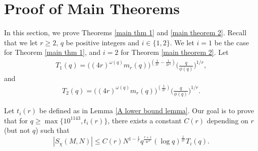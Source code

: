 \documentclass[12pt]{amsart}
\theoremstyle{plain}
\theoremstyle{definition}
\begin{document}
\section{Proof of Main Theorems}\label{sec: main theorems}
In this section, we prove Theorems \ref{main thm 1} and \ref{main theorem 2}. Recall that we let $r\ge 2$, $q$ be positive integers and $i\in \{1, 2\}$. 
We let $i = 1$ be the case for Theorem \ref{main thm 1}, and $i = 2$ for Theorem \ref{main theorem 2}. 
Let 
\begin{align}\label{eq T1}
    T_1(q) = \bigl((4r)^{\omega(q)} m_r(q)\bigr)^{\left({\frac{1}{2r}-\frac{1}{2r^2}}\right)} \biggl( \frac q{\phi(q)} \biggr)^{1/r},
\end{align}
and
\begin{align}\label{eq T2}
    T_2(q) = \bigl((4r)^{\omega(q)} m_r(q)\bigr)^{\left({\frac{1}{2r}}\right)} \biggl( \frac q{\phi(q)} \biggr)^{1/r}.
\end{align}

Let $t_i(r)$ be defined as in Lemma \ref{A lower bound lemma}. Our goal is to prove that for $q \ge \max\{10^{1143}, t_i(r)\}$, there exists a constant $C(r)$ depending on $r$ (but not $q$) such that
$$|S_{\chi}(M,N)| \le C(r)N^{1-\frac{1}{r}}q^{\frac{r+1}{4r^2}}(\log{q})^{\frac{1}{2r}}T_i(q).$$
\end{document}
